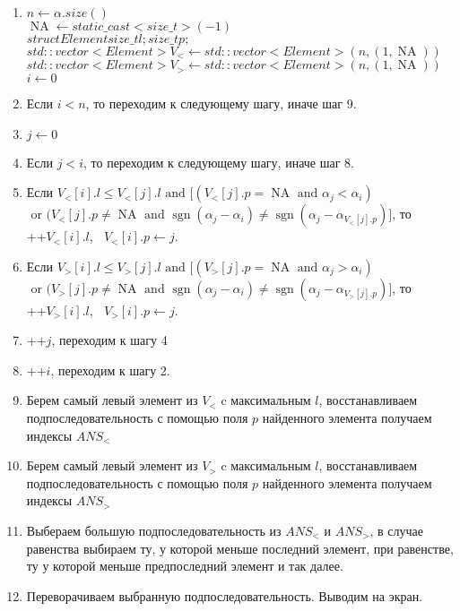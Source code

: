 \documentclass[12pt]{article}
\newcommand{\sgn}{\operatorname{sgn}}
\newcommand{\NA}{\operatorname{NA}}
\begin{document}
\begin{enumerate}
    \item $ n \leftarrow \alpha.size() $ \\
          $ \NA \leftarrow static\_cast<size\_t> (-1)$ \\
          $ struct Element { size\_t l; size\_t p; } $ \\
          $ std::vector<Element> V_< \leftarrow std::vector<Element>(n, (1, \NA)) $\\
          $ std::vector<Element> V_> \leftarrow std::vector<Element>(n, (1, \NA)) $\\
          $ i \leftarrow 0 $
    \item Если $ i < n $, то переходим к следующему шагу, иначе шаг 9.
    \item $ j \leftarrow 0 $
    \item Если $ j < i $, то переходим к следующему шагу, иначе шаг 8.
    \item Если $ V_<[i].l \le V_<[j].l \mbox {    and    } [(V_<[j].p = \NA \mbox{    and   } \alpha_j < \alpha_i) $ \\
          $\mbox{   or   } (V_<[j].p \ne \NA \mbox{    and   } \sgn(\alpha_j - \alpha_i) \ne \sgn(\alpha_j - \alpha_{V_<[j].p})] $, то \\   
          ++$V_<[i].l$, $\;\; V_<[i].p \leftarrow j $.
    \item Если $ V_>[i].l \le V_>[j].l \mbox {    and    } [(V_>[j].p = \NA \mbox{    and   } \alpha_j > \alpha_i) $ \\
          $\mbox{   or   } (V_>[j].p \ne \NA \mbox{    and   } \sgn(\alpha_j - \alpha_i) \ne \sgn(\alpha_j - \alpha_{V_>[j].p})] $, то \\   
          ++$V_>[i].l$, $\;\; V_>[i].p \leftarrow j $.

    \item ++$j$, переходим к шагу 4
    \item ++$i$, переходим к шагу 2.
    \item Берем самый левый элемент из $ V_< $ c максимальным $ l $, восстанавливаем подпоследовательность с помощью
          поля $ p $ найденного элемента получаем индексы $ ANS_< $
    \item Берем самый левый элемент из $ V_> $ c максимальным $ l $, восстанавливаем подпоследовательность с помощью
          поля $ p $ найденного элемента получаем индексы $ ANS_> $
    \item Выбераем большую подпоследовательность из $ ANS_< $ и $ ANS_> $, в случае равенства выбираем ту, у которой
          меньше последний элемент, при равенстве, ту у которой меньше предпоследний элемент и так далее.
    \item Переворачиваем выбранную подпоследовательность. Выводим на экран.
\end{enumerate}
\end{document}
